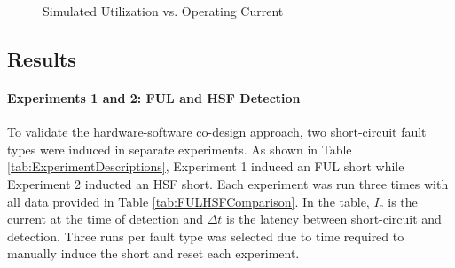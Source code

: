\begin{figure}
\centering
{}
    \caption{Simulated Utilization vs. Operating Current}
    \label{fig:Simulated Utilization}
\end{figure}

\clearpage \subsection{Results}\label{subsec:results}
\paragraph{Experiments 1 and 2: FUL and HSF Detection}
To validate the hardware-software co-design approach, two short-circuit fault types were induced in separate experiments. As shown in Table \ref{tab:ExperimentDescriptions}, Experiment 1 induced an FUL short while Experiment 2 inducted an HSF short. Each experiment was run three times with all data provided in Table \ref{tab:FULHSFComparison}. In the table, $I_{c}$ is the current at the time of detection and $\Delta t$ is the latency between short-circuit and detection. Three runs per fault type was selected due to time required to manually induce the short and reset each experiment.

